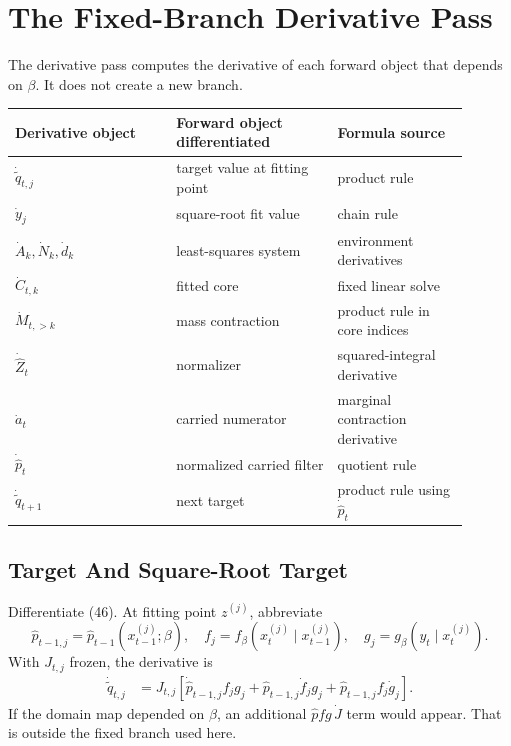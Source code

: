 \documentclass[11pt]{article}
\begin{document}
\section{The Fixed-Branch Derivative Pass}

The derivative pass computes the derivative of each forward object that depends
on \(\beta\).  It does not create a new branch.

\begin{center}
\begin{tabular}{p{0.32\linewidth}p{0.32\linewidth}p{0.26\linewidth}}
\toprule
Derivative object & Forward object differentiated & Formula source\\
\midrule
\(\dot{\widetilde q}_{t,j}\) & target value at fitting point & product rule\\
\(\dot y_j\) & square-root fit value & chain rule\\
\(\dot A_k,\dot N_k,\dot d_k\) & least-squares system & environment derivatives\\
\(\dot C_{t,k}\) & fitted core & fixed linear solve\\
\(\dot M_{t,>k}\) & mass contraction & product rule in core indices\\
\(\dot{\widehat Z}_t\) & normalizer & squared-integral derivative\\
\(\dot a_t\) & carried numerator & marginal contraction derivative\\
\(\dot{\widehat p}_t\) & normalized carried filter & quotient rule\\
\(\dot{\widetilde q}_{t+1}\) & next target & product rule using \(\dot{\widehat p}_t\)\\
\bottomrule
\end{tabular}
\end{center}

\subsection{Target And Square-Root Target}

Differentiate (46).  At fitting point \(z^{(j)}\), abbreviate
\[
    \widehat p_{t-1,j}=\widehat p_{t-1}(x_{t-1}^{(j)};\beta),
    \quad
    f_j=f_\beta(x_t^{(j)}\mid x_{t-1}^{(j)}),
    \quad
    g_j=g_\beta(y_t\mid x_t^{(j)}).
    \tag{P19-51}
\]
With \(J_{t,j}\) frozen, the derivative is
\[
\begin{aligned}
    \dot{\widetilde q}_{t,j}
    &=
    J_{t,j}
    \left[
    \dot{\widehat p}_{t-1,j} f_j g_j
    +
    \widehat p_{t-1,j}\dot f_j g_j
    +
    \widehat p_{t-1,j} f_j\dot g_j
    \right].
\end{aligned}
\tag{P19-52}
\]
If the domain map depended on \(\beta\), an additional
\(\widehat p f g\,\dot J\) term would appear.  That is outside the fixed branch
used here.
\end{document}
